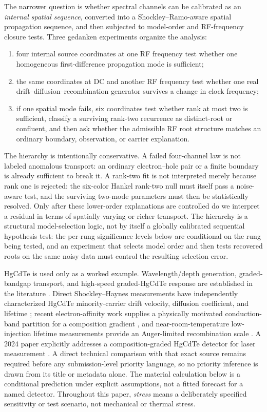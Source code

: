 \documentclass[11pt]{article}
\begin{document}
The narrower question is whether spectral channels can be calibrated as an \emph{internal spatial sequence}, converted into a Shockley--Ramo-aware spatial propagation sequence, and then subjected to model-order and RF-frequency closure tests. Three gedanken experiments organize the analysis:
\begin{enumerate}[label=(\roman*)]
    \item four internal source coordinates at one RF frequency test whether one homogeneous first-difference propagation mode is sufficient;
    \item the same coordinates at DC and another RF frequency test whether one real drift--diffusion--recombination generator survives a change in clock frequency;
    \item if one spatial mode fails, six coordinates test whether rank at most two is sufficient, classify a surviving rank-two recurrence as distinct-root or confluent, and then ask whether the admissible RF root structure matches an ordinary boundary, observation, or carrier explanation.
\end{enumerate}

The hierarchy is intentionally conservative. A failed four-channel law is not labeled anomalous transport: an ordinary electron--hole pair or a finite boundary is already sufficient to break it. A rank-two fit is not interpreted merely because rank one is rejected: the six-color Hankel rank-two null must itself pass a noise-aware test, and the surviving two-mode parameters must then be statistically resolved. Only after these lower-order explanations are controlled do we interpret a residual in terms of spatially varying or richer transport. The hierarchy is a structural model-selection logic, not by itself a globally calibrated sequential hypothesis test: the per-rung significance levels below are conditional on the rung being tested, and an experiment that selects model order and then tests recovered roots on the same noisy data must control the resulting selection error.

HgCdTe is used only as a worked example. Wavelength/depth generation, graded-bandgap transport, and high-speed graded-HgCdTe response are established in the literature \cite{Sang2022}. Direct Shockley--Haynes measurements have independently characterized HgCdTe minority-carrier drift velocity, diffusion coefficient, and lifetime \cite{Rothman2010}; recent electron-affinity work supplies a physically motivated conduction-band partition for a composition gradient \cite{RhigerMustafa2025}, and near-room-temperature low-injection lifetime measurements provide an Auger-limited recombination scale \cite{Kopytko2021}. A 2024 paper explicitly addresses a composition-graded HgCdTe detector for laser measurement \cite{Xu2024Laser}. A direct technical comparison with that exact source remains required before any submission-level priority language, so no priority inference is drawn from its title or metadata alone. The material calculation below is a conditional prediction under explicit assumptions, not a fitted forecast for a named detector. Throughout this paper, \emph{stress} means a deliberately specified sensitivity or test scenario, not mechanical or thermal stress.
\end{document}

